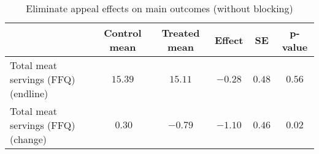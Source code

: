 \begin{table*}[ht]
\caption{Eliminate appeal effects on main outcomes (without blocking)\label{round}} 
\begin{center}
\begin{tabular}{lccccc}
\hline\hline
\multicolumn{1}{l}{}&\multicolumn{1}{c}{Control mean}&\multicolumn{1}{c}{Treated mean}&\multicolumn{1}{c}{Effect}&\multicolumn{1}{c}{SE}&\multicolumn{1}{c}{p-value}\tabularnewline
\hline
Total meat servings (FFQ) (endline)&$15.39$&$15.11$&$-0.28$&$0.48$&$0.56$\tabularnewline
Total meat servings (FFQ) (change)&$~0.30$&$-0.79$&$-1.10$&$0.46$&$0.02$\tabularnewline
\hline
\end{tabular}\end{center}

\end{table*}
